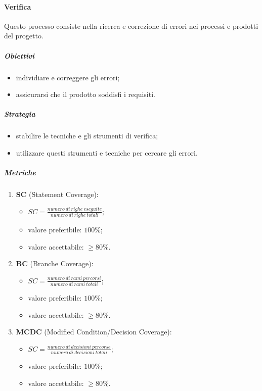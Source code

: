         \paragraph{Verifica}
            Questo processo consiste nella ricerca e correzione di errori nei processi e prodotti del progetto.
            \subparagraph{Obiettivi}
                \begin{itemize}
                    \item individiare e correggere gli errori;
                    \item assicurarsi che il prodotto soddisfi i requisiti.
                \end{itemize}
            \subparagraph{Strategia}
                \begin{itemize}
                    \item stabilire le tecniche e gli strumenti di verifica;
                    \item utilizzare questi strumenti e tecniche per cercare gli errori.
                \end{itemize}
            \subparagraph{Metriche}
                \begin{enumerate}
                    \item \textbf{SC} (Statement Coverage):
                    \begin{itemize}
                        \item $SC = \frac{numero\ di\ righe\ eseguite}{numero\ di\ righe\ totali}$;
                        \item valore preferibile: $100\%$;
                        \item valore accettabile: $\geq 80\%$.
                    \end{itemize}
                    \item \textbf{BC} (Branche Coverage):
                    \begin{itemize}
                        \item $SC = \frac{numero\ di\ rami\ percorsi}{numero\ di\ rami\ totali}$;
                        \item valore preferibile: $100\%$;
                        \item valore accettabile: $\geq 80\%$.
                    \end{itemize}
                    \item \textbf{MCDC} (Modified Condition/Decision Coverage):
                    \begin{itemize}
                        \item $SC = \frac{numero\ di\ decisioni\ percorse}{numero\ di\ decisioni\ totali}$;
                        \item valore preferibile: $100\%$;
                        \item valore accettabile: $\geq 80\%$.
                    \end{itemize}
                \end{enumerate}
